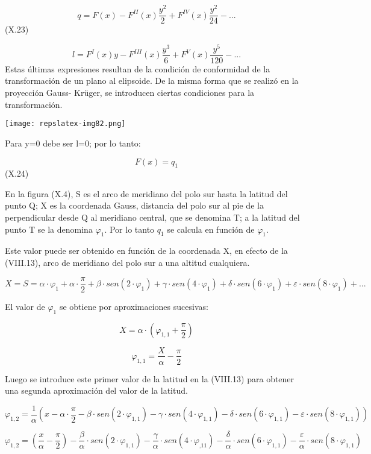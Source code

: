 \documentclass[]{article}
\begin{document}
\[q=F\left(x\right)-F^{II}\left(x\right)\frac{y^2}{2}+F^{IV}\left(x\right)\frac{y^2}{\text{24}}-\text{.}\text{.}\text{.}\]
(X.23)

\[l=F^I\left(x\right)y-F^{III}\left(x\right)\frac{y^3}{6}+F^V\left(x\right)\frac{y^5}{\text{120}}-\text{.}\text{.}\text{.}\]
Estas últimas expresiones resultan de la condición de conformidad de la
transformación de un plano al elipsoide. De la misma forma que se
realizó en la proyección Gauss- Krüger, se introducen ciertas
condiciones para la transformación.

\texttt{[image: repslatex-img82.png]}

Para y=0 debe ser l=0; por lo tanto:

\[F\left(x\right)=q_1\] (X.24)

En la figura (X.4), S es el arco de meridiano del polo sur hasta la
latitud del punto Q; X es la coordenada Gauss, distancia del polo sur al
pie de la perpendicular desde Q al meridiano central, que se denomina T;
a la latitud del punto T se la denomina \(\varphi _1\). Por lo tanto
\(q_1\) se calcula en función de \(\varphi _1\).

Este valor puede ser obtenido en función de la coordenada X, en efecto
de la (VIII.13), arco de meridiano del polo sur a una altitud
cualquiera.

\[X=S=\alpha \cdot \varphi _1+\alpha \cdot {\frac{\pi }{2}}+\beta \cdot sen\left(2\cdot \varphi _1\right)+\gamma \cdot sen\left(4\cdot \varphi _1\right)+\delta \cdot sen\left(6\cdot \varphi _1\right)+\varepsilon \cdot sen\left(8\cdot \varphi _1\right)+\text{.}\text{.}\text{.}\]

El valor de \(\varphi_1\) se obtiene por aproximaciones sucesivas:

\[X=\alpha \cdot \left(\varphi _{1,1}+\frac{\pi }{2}\right)\]

\[\varphi _{1,1}=\frac{X}{\alpha }-\frac{\pi }{2}\]

Luego se introduce este primer valor de la latitud en la (VIII.13) para
obtener una segunda aproximación del valor de la latitud.

\[\varphi _{1,2}=\frac{1}{\alpha }\left(x-\alpha \cdot {\frac{\pi}{2}}-\beta \cdot sen\left(2\cdot \varphi _{1,1}\right)-\gamma \cdot sen\left(4\cdot \varphi _{1,1}\right)-\delta \cdot sen\left(6\cdot \varphi _{1,1}\right)-\varepsilon \cdot sen\left(8\cdot \varphi _{1,1}\right)\right)\]

\[\varphi _{1,2}=\left(\frac{x}{\alpha }-\frac{\pi}{2}\right)-\frac{\beta }{\alpha }\cdot sen\left(2\cdot \varphi _{1,1}\right)-\frac{\gamma }{\alpha }\cdot sen\left(4\cdot \varphi _{,\text{11}}\right)-\frac{\delta }{\alpha }\cdot sen\left(6\cdot \varphi _{1,1}\right)-\frac{\varepsilon }{\alpha }\cdot sen\left(8\cdot \varphi _{1,1}\right)\]
\end{document}
